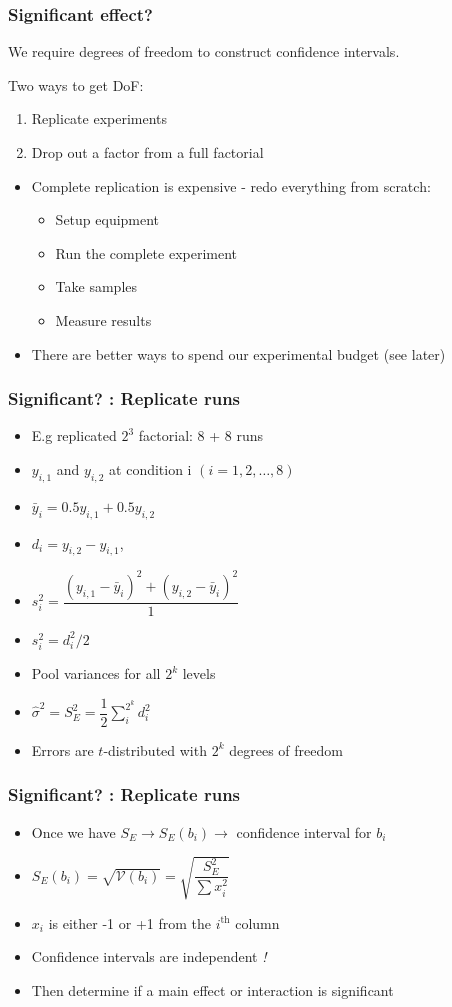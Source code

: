 \begin{frame}\frametitle{Significant effect?}

	We require degrees of freedom to construct confidence intervals.

	Two ways to get DoF:
	\begin{enumerate}
		\item	Replicate experiments
		\item	Drop out a factor from a full factorial
	\end{enumerate}
	\begin{itemize}
		\item	Complete replication is expensive - redo everything from scratch:
		\begin{itemize}
			\item	Setup equipment
			\item	Run the complete experiment
			\item	Take samples
			\item	Measure results
		\end{itemize}
		\item	There are better ways to spend our experimental budget (see later)
	\end{itemize}
\end{frame}

\begin{frame}\frametitle{Significant? : Replicate runs}
	\begin{itemize}
		\item	E.g replicated $2^3$ factorial: 8 + 8 runs
		\item	$y_{i,1}$ and $y_{i,2}$ at condition i $(i=1, 2, \ldots, 8)$
		\item	$\bar{y}_i = 0.5y_{i,1} + 0.5y_{i,2}$
		\item	$d_i = y_{i,2} - y_{i,1}$,
		\item	$s_i^2 = \dfrac{(y_{i,1} - \bar{y}_i)^2 + (y_{i,2} - \bar{y}_i)^2}{1}$
		\item	$s_i^2 = d_i^2/2$
		\item	Pool variances for all $2^k$ levels
		\item	$\hat{\sigma}^2 = S_E^2 = \dfrac{1}{2}\displaystyle\sum_i^{2^k}{d_i^2}$
		\item	Errors are $t$-distributed with $2^k$ degrees of freedom
	\end{itemize}
\end{frame}

\begin{frame}\frametitle{Significant? : Replicate runs}
	\begin{itemize}
		\item	Once we have $S_E \rightarrow S_E(b_i) \rightarrow$ confidence interval for $b_i$
		\item	$S_E(b_i) = \sqrt{\mathcal{V}\left(b_i\right)} = \sqrt{\dfrac{S_E^2}{\sum{x_i^2}}}$
		\item	$x_i$ is either -1 or +1 from the $i^\text{th}$ column
		\item	Confidence intervals are independent \emph{!}
		\item	Then determine if a main effect or interaction is significant
	\end{itemize}
\end{frame}

